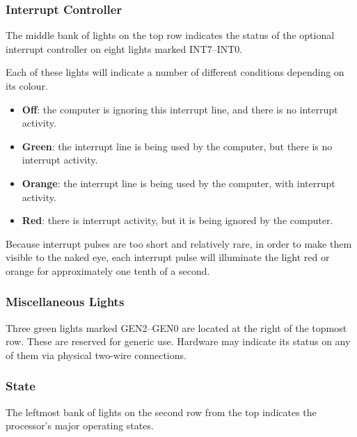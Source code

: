 \documentclass[11pt,a4paper,twocolumns]{article}
\newcommand{\lt}[1]{\textsf{#1}}
\begin{document}
\subsubsection{Interrupt Controller}

The middle bank of lights on the top row indicates the status of the optional
interrupt controller on eight lights marked \lt{INT7}–\lt{INT0}.

Each of these lights will indicate a number of different conditions depending
on its colour.

\begin{itemize}
  \item {\bf Off}: the computer is ignoring this interrupt line, and there is
    no interrupt activity.
  \item {\bf Green}: the interrupt line is being used by the computer, but
    there is no interrupt activity.
  \item {\bf Orange}: the interrupt line is being used by
    the computer, with interrupt activity.
  \item {\bf Red}: there is interrupt activity, but it is being ignored
    by the computer.
\end{itemize}

Because interrupt pulses are too short and relatively rare, in order to make
them visible to the naked eye, each interrupt pulse will illuminate the light
red or orange for approximately one tenth of a second.

\subsubsection{Miscellaneous Lights}

Three green lights marked \lt{GEN2}–\lt{GEN0} are located at the right of the
topmost row. These are reserved for generic use. Hardware may indicate its
status on any of them via physical two-wire connections.

\subsubsection{State}

The leftmost bank of lights on the second row from the top indicates the
processor's major operating states.
\end{document}
